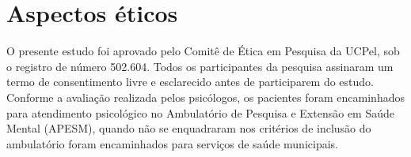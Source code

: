 \documentclass[chapter=TITLE,
               oneside,
               12pt,
               a4paper,
               english,
               brazil]{abntex2}    %
\begin{document}
\section{Aspectos éticos}\label{sec:aspectoseticos}

    O presente estudo foi aprovado pelo Comitê de Ética em Pesquisa da UCPel,
    sob o registro de número 502.604. Todos os participantes da pesquisa assinaram
    um termo de consentimento livre e esclarecido antes de participarem do estudo.
    Conforme a avaliação realizada pelos psicólogos, os pacientes foram encaminhados
    para atendimento psicológico no Ambulatório de Pesquisa e Extensão em Saúde Mental
    (APESM), quando não se enquadraram nos critérios de inclusão do ambulatório foram
    encaminhados para serviços de saúde municipais.

\endgroup

\postextual

\printbibliography

\anexos
\end{document}
